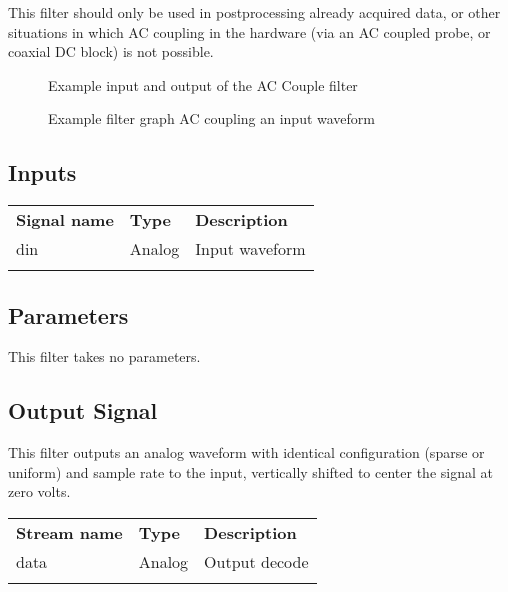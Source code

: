 This filter should only be used in postprocessing already acquired data, or other situations in which AC coupling in
the hardware (via an AC coupled probe, or coaxial DC block) is not possible.

\begin{figure}[h]
\centering
{}
\caption{Example input and output of the AC Couple filter}
\label{filter_accouple}
\end{figure}

\begin{figure}[h]
\centering
{}
\caption{Example filter graph AC coupling an input waveform}
\label{filter_graph_accouple}
\end{figure}
\FloatBarrier

\subsection{Inputs}

\begin{tabularx}{16cm}{llX}
\thickhline
\textbf{Signal name} & \textbf{Type} & \textbf{Description} \\
\thickhline
din & Analog & Input waveform \\
\thickhline
\end{tabularx}

\subsection{Parameters}

This filter takes no parameters.

\subsection{Output Signal}

This filter outputs an analog waveform with identical configuration (sparse or uniform) and sample rate to the input,
vertically shifted to center the signal at zero volts.

\begin{tabularx}{16cm}{llX}
\thickhline
\textbf{Stream name} & \textbf{Type} & \textbf{Description} \\
\thickhline
data & Analog & Output decode \\
\thickhline
\end{tabularx}

\pagebreak
